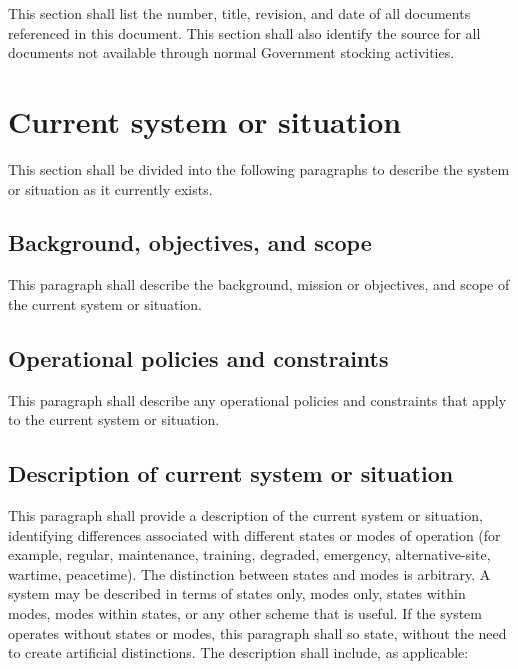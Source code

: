 \documentclass{fidata-report-template}
\begin{document}
This section shall list the number, title, revision, and date of all
documents referenced in this document. This section shall also identify
the source for all documents not available through normal Government
stocking activities.

\section{Current system or situation}

This section shall be divided into the following paragraphs to describe
the system or situation as it currently exists.

\subsection{Background, objectives, and scope}

This paragraph shall describe the background, mission or objectives, and
scope of the current system or situation.

\subsection{Operational policies and constraints}

This paragraph shall describe any operational policies and constraints
that apply to the current system or situation.

\subsection{Description of current system or situation}

This paragraph shall provide a description of the current system or
situation, identifying differences associated with different states or
modes of operation (for example, regular, maintenance, training,
degraded, emergency, alternative-site, wartime, peacetime). The
distinction between states and modes is arbitrary. A system may be
described in terms of states only, modes only, states within modes,
modes within states, or any other scheme that is useful. If the system
operates without states or modes, this paragraph shall so state, without
the need to create artificial distinctions. The description shall
include, as applicable:
\end{document}
